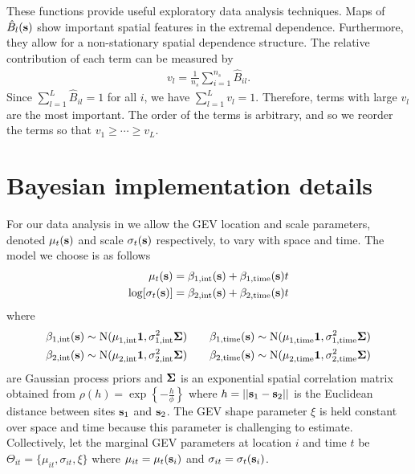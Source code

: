 These functions provide useful exploratory data analysis techniques.
Maps of $\hat{B}_l(\mathbf{s})$ show important spatial features in the extremal dependence.
Furthermore, they allow for a non-stationary spatial dependence structure.
The relative contribution of each term can be measured by
\begin{align} \label{ebeq:v}
v_l = \frac{1}{n_s}\sum_{i=1}^{n_s}{\hat B}_{il}.
\end{align}
Since $\displaystyle \sum_{l=1}^L{\hat B}_{il}=1$ for all $i$, we have $\displaystyle \sum_{l=1}^Lv_l = 1$.
Therefore, terms with large $v_l$ are the most important.
The order of the terms is arbitrary, and so we reorder the terms so that $v_1\ge \cdots \ge v_L$.

\section{Bayesian implementation details}\label{ebs:MCMC}
For our data analysis in  we allow the GEV location and scale parameters, denoted $\mu_t(\mathbf{s})$ and scale $\sigma_t(\mathbf{s})$ respectively, to vary with space and time.
The model we choose is as follows
\begin{align}\label{ebeq:GPprior}
  \mu_t(\mathbf{s}) &= \beta_{1, \text{int}}(\mathbf{s}) + \beta_{1, \text{time}}(\mathbf{s}) t\\
  \log[\sigma_t(\mathbf{s})] &= \beta_{2, \text{int}}(\mathbf{s}) + \beta_{2, \text{time}}(\mathbf{s}) t
\end{align}
where
\begin{align} \label{ebeq:GPhyper}
  \beta_{1, \text{int}}(\mathbf{s}) &\sim \text{N}(\mu^{\phantom{2}}_{1, \text{int}} \mathbf{1}, \sigma^2_{1, \text{int}} \mbox{\boldmath $\Sigma$}) \quad &\beta_{1, \text{time}}(\mathbf{s}) &\sim \text{N}(\mu^{\phantom{2}}_{1, \text{time}} \mathbf{1}, \sigma^2_{1, \text{time}} \mbox{\boldmath $\Sigma$}) \\
  \beta_{2, \text{int}}(\mathbf{s}) &\sim \text{N}(\mu^{\phantom{2}}_{2, \text{int}} \mathbf{1}, \sigma^2_{2, \text{int}} \mbox{\boldmath $\Sigma$}) \quad &\beta_{2, \text{time}}(\mathbf{s}) &\sim \text{N}(\mu^{\phantom{2}}_{2, \text{time}} \mathbf{1}, \sigma^2_{2, \text{time}} \mbox{\boldmath $\Sigma$}) \nonumber
\end{align}
are Gaussian process priors and $\mbox{\boldmath $\Sigma$}$ is an exponential spatial correlation matrix obtained from \mbox{$\rho(h) = \exp\left\{- \frac{h}{\phi}\right\}$} where $h = ||\mathbf{s}_1 - \mathbf{s}_2||$ is the Euclidean distance between sites $\mathbf{s}_1$ and $\mathbf{s}_2$.
The GEV shape parameter $\xi$ is held constant over space and time because this parameter is challenging to estimate.
Collectively, let the marginal GEV parameters at location $i$ and time $t$ be $\Theta_{it} = \{\mu_{it},\sigma_{it},\xi\}$ where $\mu_{it} = \mu_t(\mathbf{s}_i)$ and $\sigma_{it} = \sigma_t(\mathbf{s}_i)$.


